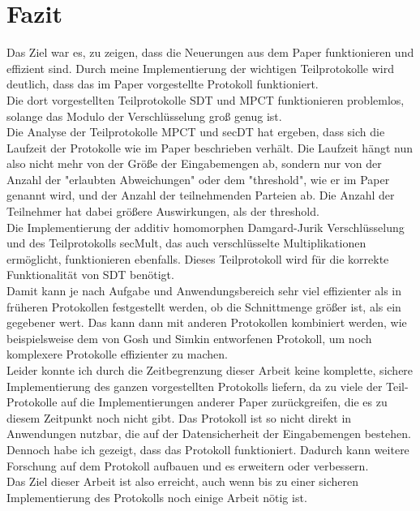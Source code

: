 \chapter{Fazit}

Das Ziel war es, zu zeigen, dass die Neuerungen aus dem Paper \cite{Doettling2021} funktionieren und effizient sind. Durch meine Implementierung der wichtigen Teilprotokolle wird deutlich, dass das im Paper \cite{Doettling2021} vorgestellte Protokoll funktioniert. \\
Die dort vorgestellten Teilprotokolle SDT und MPCT funktionieren problemlos, solange das Modulo der Verschlüsselung groß genug ist.\\
Die Analyse der Teilprotokolle MPCT und secDT hat ergeben, dass sich die Laufzeit der Protokolle wie im Paper beschrieben verhält. Die Laufzeit hängt nun also nicht mehr von der Größe der Eingabemengen ab, sondern nur von der Anzahl der "erlaubten Abweichungen" oder dem "threshold", wie er im Paper genannt wird, und der Anzahl der teilnehmenden Parteien ab. Die Anzahl der Teilnehmer hat dabei größere Auswirkungen, als der threshold.\\
Die Implementierung der additiv homomorphen Damgard-Jurik Verschlüsselung und des Teilprotokolls secMult, das auch verschlüsselte Multiplikationen ermöglicht, funktionieren ebenfalls. Dieses Teilprotokoll wird für die korrekte Funktionalität von SDT benötigt.\\
Damit kann je nach Aufgabe und Anwendungsbereich sehr viel effizienter als in früheren Protokollen festgestellt werden, ob die Schnittmenge größer ist, als ein gegebener wert. Das kann dann mit anderen Protokollen kombiniert werden, wie beispielsweise dem von Gosh und Simkin \cite{Ghosh2019} entworfenen Protokoll, um noch komplexere Protokolle effizienter zu machen. \\
Leider konnte ich durch die Zeitbegrenzung dieser Arbeit keine komplette, sichere Implementierung des ganzen vorgestellten Protokolls liefern, da zu viele der Teil-Protokolle auf die Implementierungen anderer Paper zurückgreifen, die es zu diesem Zeitpunkt noch nicht gibt.
Das Protokoll ist so nicht direkt in Anwendungen nutzbar, die auf der Datensicherheit der Eingabemengen bestehen.\\
Dennoch habe ich gezeigt, dass das Protokoll funktioniert. Dadurch kann weitere Forschung auf dem Protokoll aufbauen und es erweitern oder verbessern.\\
Das Ziel dieser Arbeit ist also erreicht, auch wenn bis zu einer sicheren Implementierung des Protokolls noch einige Arbeit nötig ist.